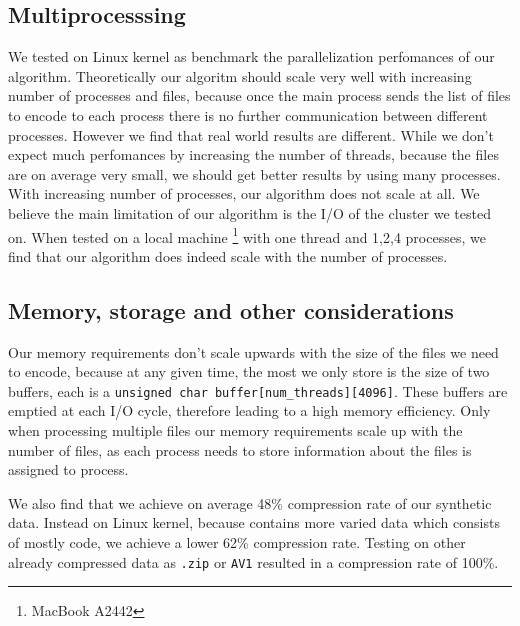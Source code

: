 \subsection{Multiprocesssing}
We tested on Linux kernel as benchmark the parallelization perfomances of our algorithm. Theoretically our algoritm should scale very well with increasing number of processes and files, because once the main process sends the list of files to encode to each process there is no further communication between different processes. However we find that real world results are different. 
While we don't expect much perfomances by increasing the number of threads, because the files are on average very small, we should get better results by using many processes.
With increasing number of processes, our algorithm does not scale at all. We believe the main limitation of our algorithm is the I/O of the cluster we tested on. When tested on a local machine \footnote{MacBook A2442} with one thread and 1,2,4 processes, we find that our algorithm does indeed scale with the number of processes. 
\subsection{Memory, storage and other considerations}
Our memory requirements don't scale upwards with the size of the files we need to encode, because at any given time, the most we only store is the size of two buffers, each is a \verb|unsigned char buffer[num_threads][4096]|. These buffers are emptied at each I/O cycle, therefore leading to a high memory efficiency. Only when processing multiple files our memory requirements scale up with the number of files, as each process needs to store information about the files is assigned to process.

We also find that we achieve on average 48\% compression rate of our synthetic data. Instead on Linux kernel, because contains more varied data which consists of mostly code, we achieve a lower 62\% compression rate. Testing on other already compressed data as \verb|.zip| or \verb|AV1| resulted in a compression rate of 100\%.
